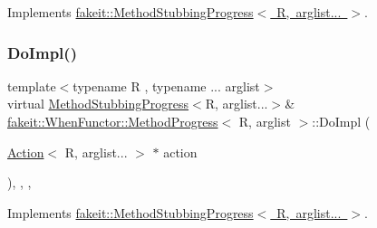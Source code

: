 Implements \mbox{\hyperlink{structfakeit_1_1MethodStubbingProgress_a73218fd396f0096f93462f2d4656c509}{fakeit\+::\+Method\+Stubbing\+Progress$<$ R, arglist... $>$}}.

\mbox{\label{structfakeit_1_1WhenFunctor_1_1MethodProgress_a4b8a947b1514fe715743ee8e65953d9d}} 
\subsubsection{\texorpdfstring{DoImpl()}{DoImpl()}\hspace{0.1cm}{\footnotesize\ttfamily [4/9]}}
{\footnotesize\ttfamily template$<$typename R , typename ... arglist$>$ \\
virtual \mbox{\hyperlink{structfakeit_1_1MethodStubbingProgress}{Method\+Stubbing\+Progress}}$<$R, arglist...$>$\& \mbox{\hyperlink{structfakeit_1_1WhenFunctor_1_1MethodProgress}{fakeit\+::\+When\+Functor\+::\+Method\+Progress}}$<$ R, arglist $>$\+::Do\+Impl (\begin{DoxyParamCaption}\item[{\mbox{\hyperlink{structfakeit_1_1Action}{Action}}$<$ R, arglist... $>$ $\ast$}]{action }\end{DoxyParamCaption})\hspace{0.3cm}{\ttfamily [inline]}, {\ttfamily [override]}, {\ttfamily [protected]}, {\ttfamily [virtual]}}



Implements \mbox{\hyperlink{structfakeit_1_1MethodStubbingProgress_a73218fd396f0096f93462f2d4656c509}{fakeit\+::\+Method\+Stubbing\+Progress$<$ R, arglist... $>$}}.

\mbox{\label{structfakeit_1_1WhenFunctor_1_1MethodProgress_a4b8a947b1514fe715743ee8e65953d9d}} 
